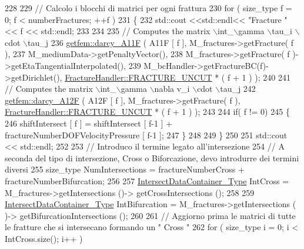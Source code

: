 \begin{DoxyCode}
228     
229     \textcolor{comment}{// Calcolo i blocchi di matrici per ogni frattura}
230     \textcolor{keywordflow}{for} ( size\_type f = 0; f < numberFractures; ++f )
231     \{
232         std::cout <<std::endl<< \textcolor{stringliteral}{"Fracture "} << f << std::endl;
233 
234         
235         \textcolor{comment}{// Computes the matrix \(\backslash\)int\_\(\backslash\)gamma \(\backslash\)tau\_i \(\backslash\)cdot \(\backslash\)tau\_j}
236         \hyperlink{namespacegetfem_aba6f1b4f1d395aae3d96071cad4953a2}{getfem::darcy\_A11F} ( A11F [ f ], M\_fractures->getFracture( f ),
237                              M\_mediumData->getPenaltyVector(),
238                              M\_fractures->getFracture( f )->getEtaTangentialInterpolated(),
239                              M\_bcHandler->getFractureBC(f)->getDirichlet(), 
      \hyperlink{classFractureHandler_a495ad4fc72d0c47c8f0424842f1153aaaa992cc3ad024a030ecd798dc319c95ac}{FractureHandler::FRACTURE\_UNCUT} * ( f + 1 ) );
240 
241         \textcolor{comment}{// Computes the matrix \(\backslash\)int\_\(\backslash\)gamma \(\backslash\)nabla v\_i \(\backslash\)cdot \(\backslash\)tau\_j}
242         \hyperlink{namespacegetfem_ab62aa98cfcf55810e1518906202cbedc}{getfem::darcy\_A12F} ( A12F [ f ], M\_fractures->getFracture( f ), 
      \hyperlink{classFractureHandler_a495ad4fc72d0c47c8f0424842f1153aaaa992cc3ad024a030ecd798dc319c95ac}{FractureHandler::FRACTURE\_UNCUT} * ( f + 1 ) );
243         
244         \textcolor{keywordflow}{if}( f != 0)
245         \{
246             shiftIntersect [ f ] = shiftIntersect [ f-1 ] + fractureNumberDOFVelocityPressure [ f-1 ];  
247         \}
248         
249     \}
250 
251     std::cout << std::endl;
252     
253     \textcolor{comment}{// Introduco il termine legato all'intersezione}
254     \textcolor{comment}{// A seconda del tipo di intersezione, Cross o Biforcazione, devo introdurre dei termini diversi}
255     size\_type NumIntersections = fractureNumberCross + fractureNumberBifurcation;
256   
257     \hyperlink{IntersectData_8h_a822ec3b760dfb603e1cf0bfe3ad5636a}{IntersectDataContainer\_Type} IntCross = M\_fractures->getIntersections ()-> 
      getCrossIntersections ();
258     
259     \hyperlink{IntersectData_8h_a822ec3b760dfb603e1cf0bfe3ad5636a}{IntersectDataContainer\_Type} IntBifurcation = M\_fractures->getIntersections (
      )-> getBifurcationIntersections ();
260     
261     \textcolor{comment}{// Aggiorno prima le matrici di tutte le fratture che si intersecano formando un " Cross "}
262     \textcolor{keywordflow}{for} ( size\_type i = 0; i < IntCross.size(); i++ )

\end{DoxyCode}
